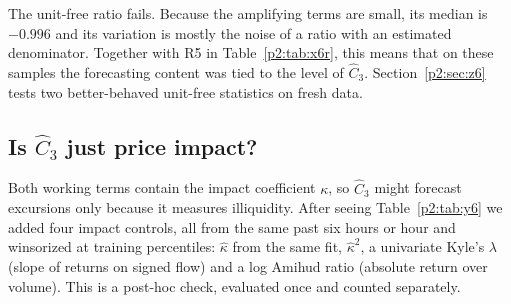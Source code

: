 The unit-free ratio fails. Because the amplifying terms are small, its median is $-0.996$ and its variation is mostly the noise of a ratio with an estimated denominator. Together with R5 in Table~\ref{p2:tab:x6r}, this means that on these samples the forecasting content was tied to the level of $\hat C_3$. Section~\ref{p2:sec:z6} tests two better-behaved unit-free statistics on fresh data.

\subsection{Is $\hat C_3$ just price impact?}\label{p2:sec:y8}
Both working terms contain the impact coefficient $\kappa$, so $\hat C_3$ might forecast excursions only because it measures illiquidity. After seeing Table~\ref{p2:tab:y6} we added four impact controls, all from the same past six hours or hour and winsorized at training percentiles: $\hat\kappa$ from the same fit, $\hat\kappa^2$, a univariate Kyle's $\lambda$ \citep{p2:kyle1985} (slope of returns on signed flow) and a log Amihud ratio \citep{p2:amihud2002} (absolute return over volume). This is a post-hoc check, evaluated once and counted separately.

